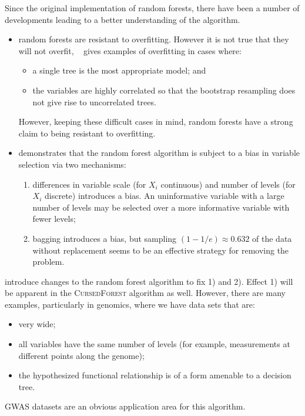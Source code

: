 \documentclass[10pt,letterpaper]{article}
\newcommand{\cursedforest}{\textsc{CursedForest}\xspace}
\begin{document}
Since the original implementation of random forests, there have been a number of developments leading to a better
understanding of the algorithm.
\begin{itemize}
\item random forests are resistant to overfitting. However it is not true that they will not overfit,
  ~\cite{Segal.2004} gives examples of overfitting in cases where:
  \begin{itemize}
  \item a single tree is the most appropriate model; and
  \item the variables are highly correlated so that the bootstrap resampling does not give rise to uncorrelated trees.
  \end{itemize}
However, keeping these difficult cases in mind, random forests have a strong claim to being resistant to overfitting.
\item \cite{Strobl.et.al.2007} demonstrates that the random forest algorithm is subject to a bias in variable selection
  via two mechanisms:
  \begin{enumerate}
  \item differences in variable scale (for $X_i$ continuous) and number of levels (for $X_i$ discrete) introduces a
    bias. An uninformative variable with a large number of levels may be selected over a more informative variable with
    fewer levels;
  \item bagging introduces a bias, but sampling $(1- 1/e) \approx 0.632$ of the data without replacement seems to be an
    effective strategy for removing the problem.
  \end{enumerate}
\end{itemize} 

\cite{Strobl.et.al.2007} introduce changes to the random forest algorithm to fix 1) and 2).  Effect 1) will be apparent
in the \cursedforest algorithm as well.  However, there are many examples, particularly in genomics, where we have data
sets that are:
\begin{itemize}
\item very wide;
\item all variables have the same number of levels (for example, measurements at different points along the genome);
\item the hypothesized functional relationship is of a form amenable to a decision tree.
\end{itemize}
GWAS datasets are an obvious application area for this algorithm. 
\end{document}
